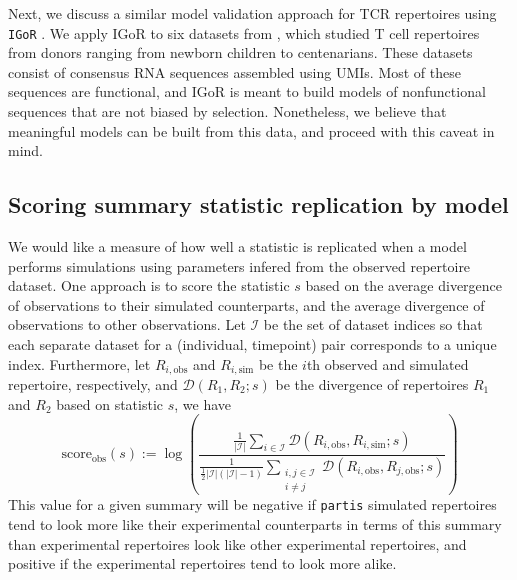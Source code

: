 \documentclass{article}
\begin{document}
Next, we discuss a similar model validation approach for TCR repertoires using \texttt{IGoR} \cite{Marcou2018-du}.
We apply IGoR to six datasets from \cite{Britanova2016-iw}, which studied T cell repertoires from donors ranging from newborn children to centenarians.
These datasets consist of consensus RNA sequences assembled using UMIs.
Most of these sequences are functional, and IGoR is meant to build models of nonfunctional sequences that are not biased by selection.
Nonetheless, we believe that meaningful models can be built from this data, and proceed with this caveat in mind.

\subsection*{Scoring summary statistic replication by model}
We would like a measure of how well a statistic is replicated when a model performs simulations using parameters infered from the observed repertoire dataset.
One approach is to score the statistic $s$ based on the average divergence of observations to their simulated counterparts, and the average divergence of observations to other observations.
Let $\mathcal I$ be the set of dataset indices so that each separate dataset for a (individual, timepoint) pair corresponds to a unique index.
Furthermore, let $R_{i, \text{obs}}$ and $R_{i, \text{sim}}$ be the $i$th observed and simulated repertoire, respectively, and $\mathcal D(R_1, R_2; s)$ be the divergence of repertoires $R_1$ and $R_2$ based on statistic $s$, we have
\begin{equation}
    \text{score}_\text{obs}(s) := \log \left( \frac{ \frac{1}{|\mathcal I|} \sum_{i \in \mathcal I} \mathcal D \left( R_{i, \text{obs}}, R_{i, \text{sim}} ; s\right) }
    { \frac{1}{\frac{1}{2} |\mathcal I|\left(|\mathcal I| - 1\right)}
        \sum_{\substack{i, j \in \mathcal I \\ i \ne j}} \mathcal D\left(R_{i, \text{obs}}, R_{j, \text{obs}}; s\right) } \right)
\end{equation}
This value for a given summary will be negative if \texttt{partis} simulated repertoires tend to look more like their experimental counterparts in terms of this summary than experimental repertoires look like other experimental repertoires, and positive if the experimental repertoires tend to look more alike.
\end{document}
